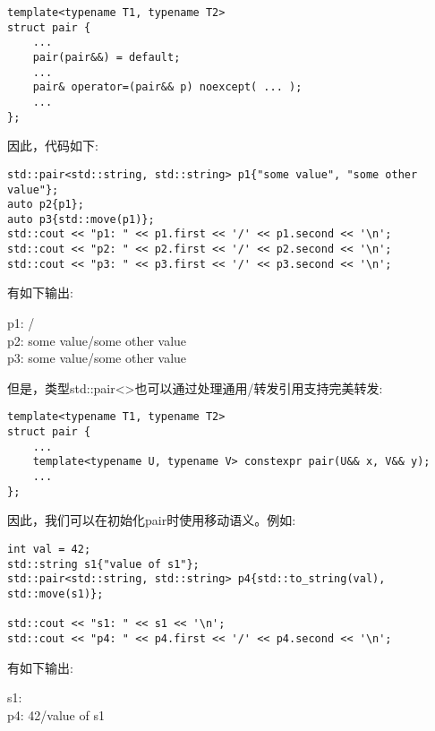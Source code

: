 \begin{lstlisting}[caption={}]
template<typename T1, typename T2>
struct pair {
	...
	pair(pair&&) = default;
	...
	pair& operator=(pair&& p) noexcept( ... );
	...
};
\end{lstlisting}

因此，代码如下:\par

\begin{lstlisting}[caption={}]
std::pair<std::string, std::string> p1{"some value", "some other value"};
auto p2{p1};
auto p3{std::move(p1)};
std::cout << "p1: " << p1.first << '/' << p1.second << '\n';
std::cout << "p2: " << p2.first << '/' << p2.second << '\n';
std::cout << "p3: " << p3.first << '/' << p3.second << '\n';
\end{lstlisting}

有如下输出:\par

\begin{tcolorbox}[colback=white,colframe=black]
p1: / \\
p2: some value/some other value \\
p3: some value/some other value
\end{tcolorbox}

但是，类型std::pair<>也可以通过处理通用/转发引用支持完美转发:\par

\begin{lstlisting}[caption={}]
template<typename T1, typename T2>
struct pair {
	...
	template<typename U, typename V> constexpr pair(U&& x, V&& y);
	...
};
\end{lstlisting}

因此，我们可以在初始化pair时使用移动语义。例如:\par

\begin{lstlisting}[caption={}]
int val = 42;
std::string s1{"value of s1"};
std::pair<std::string, std::string> p4{std::to_string(val), std::move(s1)};

std::cout << "s1: " << s1 << '\n';
std::cout << "p4: " << p4.first << '/' << p4.second << '\n';
\end{lstlisting}

有如下输出:\par

\begin{tcolorbox}[colback=white,colframe=black]
s1: \\
p4: 42/value of s1
\end{tcolorbox}

